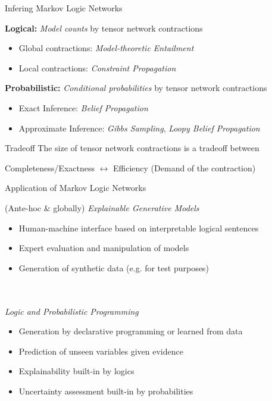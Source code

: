 \documentclass{beamer}
\begin{document}
\begin{frame}{Infering Markov Logic Networks}

	\textbf{Logical:} \emph{Model counts} by tensor network contractions
	\begin{itemize}
		\item Global contractions: \emph{Model-theoretic Entailment}
		\item Local contractions: \emph{Constraint Propagation} 
	\end{itemize}
	
	\textbf{Probabilistic:} \emph{Conditional probabilities} by tensor network contractions	
	\begin{itemize}
		\item Exact Inference: \emph{Belief Propagation}
		\item Approximate Inference: \emph{Gibbs Sampling}, \emph{Loopy Belief Propagation}
	\end{itemize}

\begin{block}{Tradeoff}
	The size of tensor network contractions is a tradeoff between
	\begin{center}
		Completeness/Exactness  $\leftrightarrow$  Efficiency (Demand of the contraction)
	\end{center}
\end{block}

\end{frame}




\begin{frame}{Application of Markov Logic Networks}

(Ante-hoc \& globally) \emph{Explainable Generative Models} 
\begin{itemize}
	\item Human-machine interface based on interpretable logical sentences
	\item Expert evaluation and manipulation of models
	\item Generation of synthetic data (e.g. for test purposes)
\end{itemize}
\ \\ \ \\
\emph{Logic and Probabilistic Programming}
\begin{itemize}
	\item Generation by declarative programming or learned from data
	\item Prediction of unseen variables given evidence
	\item Explainability built-in by logics
	\item Uncertainty assessment built-in by probabilities
\end{itemize}
\ \\ \ \\
	
\end{frame}
\end{document}

